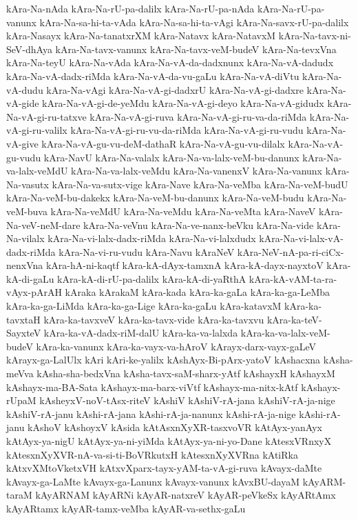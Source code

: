 {kAra-Na-nAda
kAra-Na-rU-pa-dalilx
kAra-Na-rU-pa-nAda
kAra-Na-rU-pa-vanunx
kAra-Na-sa-hi-ta-vAda
kAra-Na-sa-hi-ta-vAgi
kAra-Na-savx-rU-pa-dalilx
kAra-Nasayx
kAra-Na-tanatxrXM
kAra-Natavx
kAra-NatavxM
kAra-Na-tavx-ni-SeV-dhAya
kAra-Na-tavx-vanunx
kAra-Na-tavx-veM-budeV
kAra-Na-tevxVna
kAra-Na-teyU
kAra-Na-vAda
kAra-Na-vA-da-dadxnunx
kAra-Na-vA-dadudx
kAra-Na-vA-dadx-riMda
kAra-Na-vA-da-vu-gaLu
kAra-Na-vA-diVtu
kAra-Na-vA-dudu
kAra-Na-vAgi
kAra-Na-vA-gi-dadxrU
kAra-Na-vA-gi-dadxre
kAra-Na-vA-gide
kAra-Na-vA-gi-de-yeMdu
kAra-Na-vA-gi-deyo
kAra-Na-vA-gidudx
kAra-Na-vA-gi-ru-tatxve
kAra-Na-vA-gi-ruva
kAra-Na-vA-gi-ru-va-da-riMda
kAra-Na-vA-gi-ru-valilx
kAra-Na-vA-gi-ru-vu-da-riMda
kAra-Na-vA-gi-ru-vudu
kAra-Na-vA-give
kAra-Na-vA-gu-vu-deM-dathaR
kAra-Na-vA-gu-vu-dilalx
kAra-Na-vA-gu-vudu
kAra-NavU
kAra-Na-valalx
kAra-Na-va-lalx-veM-bu-danunx
kAra-Na-va-lalx-veMdU
kAra-Na-va-lalx-veMdu
kAra-Na-vanenxV
kAra-Na-vanunx
kAra-Na-vasutx
kAra-Na-va-sutx-vige
kAra-Nave
kAra-Na-veMba
kAra-Na-veM-budU
kAra-Na-veM-bu-dakekx
kAra-Na-veM-bu-danunx
kAra-Na-veM-budu
kAra-Na-veM-buva
kAra-Na-veMdU
kAra-Na-veMdu
kAra-Na-veMta
kAra-NaveV
kAra-Na-veV-neM-dare
kAra-Na-veVnu
kAra-Na-ve-nanx-beVku
kAra-Na-vide
kAra-Na-vilalx
kAra-Na-vi-lalx-dadx-riMda
kAra-Na-vi-lalxdudx
kAra-Na-vi-lalx-vA-dadx-riMda
kAra-Na-vi-ru-vudu
kAra-Navu
kAraNeV
kAra-NeV-nA-pa-ri-ciCx-nenxVna
kAra-hA-ni-kaqtf
kAra-kA-dAyx-tamxnA
kAra-kA-dayx-nayxtoV
kAra-kA-di-gaLu
kAra-kA-di-rU-pa-dalilx
kAra-kA-di-yaRthA
kAra-kA-vAM-ta-ra-vAyx-pArAH
kAraka
kArakaM
kAra-kada
kAra-ka-gaLa
kAra-ka-ga-LeMba
kAra-ka-ga-LiMda
kAra-ka-ga-Lige
kAra-ka-gaLu
kAra-katavxM
kAra-ka-tavxtaH
kAra-ka-tavxveV
kAra-ka-tavx-vide
kAra-ka-tavxvu
kAra-ka-teV-SayxteV
kAra-ka-vA-dadx-riM-dalU
kAra-ka-va-lalxda
kAra-ka-va-lalx-veM-budeV
kAra-ka-vanunx
kAra-ka-vayx-va-hAroV
kArayx-darx-vayx-gaLeV
kArayx-ga-LalUlx
kAri
kAri-ke-yalilx
kAshAyx-Bi-pArx-yatoV
kAshacxna
kAsha-meVva
kAsha-sha-bedxVna
kAsha-tavx-saM-sharx-yAtf
kAshayxH
kAshayxM
kAshayx-ma-BA-Sata
kAshayx-ma-barx-viVtf
kAshayx-ma-nitx-kAtf
kAshayx-rUpaM
kAsheyxV-noV-tAsx-riteV
kAshiV
kAshiV-rA-jana
kAshiV-rA-ja-nige
kAshiV-rA-janu
kAshi-rA-jana
kAshi-rA-ja-nanunx
kAshi-rA-ja-nige
kAshi-rA-janu
kAshoV
kAshoyxV
kAsida
kAtAsxnXyXR-tasxvoVR
kAtAyx-yanAyx
kAtAyx-ya-nigU
kAtAyx-ya-ni-yiMda
kAtAyx-ya-ni-yo-Dane
kAtesxVRnxyX
kAtesxnXyXVR-nA-va-si-ti-BoVRkutxH
kAtesxnXyXVRna
kAtiRka
kAtxvXMtoVketxVH
kAtxvXparx-tayx-yAM-ta-vA-gi-ruva
kAvayx-daMte
kAvayx-ga-LaMte
kAvayx-ga-Lanunx
kAvayx-vanunx
kAvxBU-dayaM
kAyARM-taraM
kAyARNAM
kAyARNi
kAyAR-natxreV
kAyAR-peVkeSx
kAyARtAmx
kAyARtamx
kAyAR-tamx-veMba
kAyAR-va-sethx-gaLu
}
